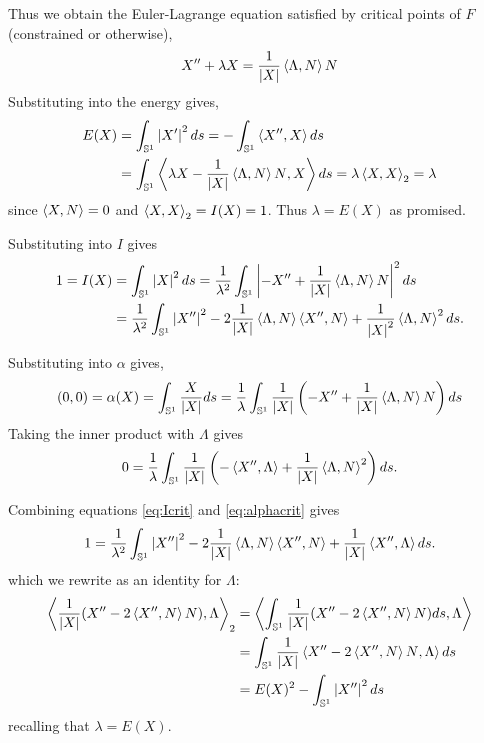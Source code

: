 \documentclass[12pt]{article}
\begin{document}
Thus we obtain the Euler-Lagrange equation satisfied by critical points of \(F\) (constrained or otherwise),
\begin{equation}
\label{eq:el}
X'' + \lambda X = \frac{1}{\left|{X}\right|} \left\langle{\Lambda},{N}\right\rangle N
\end{equation}
Substituting into the energy gives,
\begin{equation}
\label{eq:Ecrit}
\begin{split}
E(X) &= \int_{\operatorname{\mathbb{S}^1}} \left|{X'}\right|^2 ds = -\int_{\operatorname{\mathbb{S}^1}} \left\langle{X''},{X}\right\rangle ds \\
&= \int_{\operatorname{\mathbb{S}^1}} \left\langle{\lambda X - \frac{1}{\left|{X}\right|} \ensuremath{\left\langle{\Lambda},{N}\right\rangle}N},{X}\right\rangle ds = \lambda \left\langle{X},{X}\right\rangle_2 = \lambda
\end{split}
\end{equation}
since \(\left\langle{X},{N}\right\rangle = 0\) and \(\left\langle{X},{X}\right\rangle_2 = I(X) = 1\). Thus \(\lambda = E(X)\) as promised.

Substituting into \(I\) gives
\begin{equation}
\label{eq:Icrit}
\begin{split}
1 = I(X) &= \int_{\operatorname{\mathbb{S}^1}} \left|{X}\right|^2 ds = \frac{1}{\lambda^2} \int_{\operatorname{\mathbb{S}^1}} \left|{-X'' +  \frac{1}{\left|{X}\right|} \left\langle{\Lambda},{N}\right\rangle N}\right|^2 ds \\
&= \frac{1}{\lambda^2} \int_{\operatorname{\mathbb{S}^1}} \left|{X''}\right|^2 - 2\frac{1}{\left|{X}\right|} \left\langle{\Lambda},{N}\right\rangle\left\langle{X''},{N}\right\rangle + \frac{1}{\left|{X}\right|^2} \left\langle{\Lambda},{N}\right\rangle^2 ds.
\end{split}
\end{equation}

Substituting into \(\alpha\) gives,
\[
(0, 0) = \alpha(X) = \int_{\operatorname{\mathbb{S}^1}} \frac{X}{\left|{X}\right|} ds = \frac{1}{\lambda} \int_{\operatorname{\mathbb{S}^1}} \frac{1}{\left|{X}\right|} \left(-X'' + \frac{1}{\left|{X}\right|} \left\langle{\Lambda},{N}\right\rangle N\right) ds
\]
Taking the inner product with \(\Lambda\) gives
\begin{equation}
\label{eq:alphacrit}
0 = \frac{1}{\lambda} \int_{\operatorname{\mathbb{S}^1}} \frac{1}{\left|{X}\right|} \left(-\left\langle{X''},{\Lambda}\right\rangle + \frac{1}{\left|{X}\right|} \left\langle{\Lambda},{N}\right\rangle^2\right) ds.
\end{equation}

Combining equations \eqref{eq:Icrit} and \eqref{eq:alphacrit} gives
\[
1 = \frac{1}{\lambda^2} \int_{\operatorname{\mathbb{S}^1}} \left|{X''}\right|^2 - 2\frac{1}{\left|{X}\right|} \left\langle{\Lambda},{N}\right\rangle\left\langle{X''},{N}\right\rangle +  \frac{1}{\left|{X}\right|} \left\langle{X''},{\Lambda}\right\rangle ds.
\]
which we rewrite as an identity for \(\Lambda\):
\begin{equation}
\label{eq:Lambdaeqn}
\begin{split}
\left\langle{\frac{1}{\left|{X}\right|} (X'' - 2 \ensuremath{\left\langle{X''},{N}\right\rangle}N)},{\Lambda}\right\rangle_2 &= \left\langle{\int_{\operatorname{\mathbb{S}^1}} \frac{1}{\left|{X}\right|} (X'' - 2 \ensuremath{\left\langle{X''},{N}\right\rangle}N) ds},{\Lambda}\right\rangle \\
&= \int_{\operatorname{\mathbb{S}^1}} \frac{1}{\left|{X}\right|} \left\langle{X'' - 2 \ensuremath{\left\langle{X''},{N}\right\rangle}N},{\Lambda}\right\rangle ds \\
&= E(X)^2 - \int_{\operatorname{\mathbb{S}^1}} \left|{X''}\right|^2 ds
\end{split}
\end{equation}
recalling that \(\lambda = E(X)\).
\end{document}
